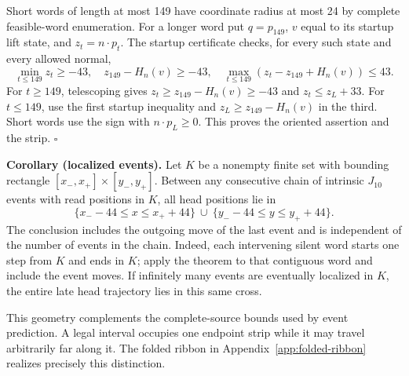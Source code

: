 Short words of length at most 149 have coordinate radius at most 24 by
complete feasible-word enumeration. For a longer word put $q=p_{149}$,
$v$ equal to its startup lift state, and $z_t=n\cdot p_t$. The startup
certificate checks, for every such state and every allowed normal,
\[
 \min_{t\le149}z_t\ge-43,\quad z_{149}-H_n(v)\ge-43,\quad
 \max_{t\le149}(z_t-z_{149}+H_n(v))\le43.
\]
For $t\ge149$, telescoping gives $z_t\ge z_{149}-H_n(v)\ge-43$
and $z_t\le z_L+33$. For $t\le149$, use the first startup inequality
and $z_L\ge z_{149}-H_n(v)$ in the third. Short words use the sign
with $n\cdot p_L\ge0$. This proves the oriented assertion and the strip.
\hfill$\square$

\textbf{Corollary (localized events).}
Let $K$ be a nonempty finite set with bounding rectangle
$[x_-,x_+]\times[y_-,y_+]$. Between any consecutive chain of intrinsic
$J_{10}$ events with read positions in $K$, all head positions lie in
\[
 \{x_- -44\le x\le x_+ +44\}\ \cup\
 \{y_- -44\le y\le y_+ +44\}.
\]
The conclusion includes the outgoing move of the last event and is independent
of the number of events in the chain. Indeed, each intervening silent word
starts one step from $K$ and ends in $K$; apply the theorem to that contiguous
word and include the event moves. If infinitely many events are eventually
localized in $K$, the entire late head trajectory lies in this same cross.

This geometry complements the complete-source bounds used by event prediction.
A legal interval occupies one endpoint strip while it may travel arbitrarily
far along it. The folded ribbon in Appendix~\ref{app:folded-ribbon} realizes precisely this distinction.

